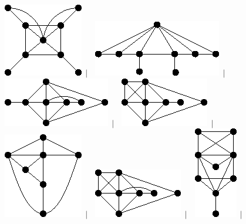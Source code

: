 \documentclass[11pt,paper=b5,footinclude,headinclude]{scrbook} %
\newtheorem{ex}{Vaja\hypertarget{sol:\theex}}[chapter]
\begin{document}
\begin{ex}
\begin{figure}
\includegraphics[scale=0.5]{smallGraphs/g_X140.png}$\,\mid\,$\
\includegraphics[scale=0.5]{smallGraphs/g_X141.png}$\,\mid\,$\
\includegraphics[scale=0.5]{smallGraphs/g_X143.png}$\,\mid\,$\
\includegraphics[scale=0.5]{smallGraphs/g_X146.png}$\,\mid\,$\
\includegraphics[scale=0.5]{smallGraphs/g_X15.png}$\,\mid\,$\
\includegraphics[scale=0.5]{smallGraphs/g_X151.png}$\,\mid\,$\
\includegraphics[scale=0.5]{smallGraphs/g_X153.png}$\,\mid\,$\

\end{figure}
\end{ex}
\end{document}
